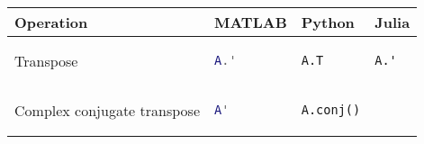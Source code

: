 \documentclass[10pt, landscape]{article}
\begin{document}
\begin{multicols}{2}
\begin{tabular}[]{@{}llll@{}}
\toprule
\begin{minipage}[b]{0.24\columnwidth}\raggedright\strut
Operation\strut
\end{minipage} & \begin{minipage}[b]{0.23\columnwidth}\raggedright\strut
MATLAB\strut
\end{minipage} & \begin{minipage}[b]{0.20\columnwidth}\raggedright\strut
Python\strut
\end{minipage} & \begin{minipage}[b]{0.20\columnwidth}\raggedright\strut
Julia\strut
\end{minipage}\tabularnewline
\midrule
\begin{minipage}[t]{0.24\columnwidth}\raggedright\strut
Transpose\strut
\end{minipage} & \begin{minipage}[t]{0.23\columnwidth}\raggedright\strut
\begin{lstlisting}[language=Matlab]
A.'
\end{lstlisting}
\strut
\end{minipage} & \begin{minipage}[t]{0.20\columnwidth}\raggedright\strut
\begin{lstlisting}[language=Python]
A.T
\end{lstlisting}
\strut
\end{minipage} & \begin{minipage}[t]{0.20\columnwidth}\raggedright\strut
\begin{lstlisting}
A.'
\end{lstlisting}
\strut
\end{minipage}\tabularnewline
\begin{minipage}[t]{0.24\columnwidth}\raggedright\strut
Complex conjugate transpose\strut
\end{minipage} & \begin{minipage}[t]{0.23\columnwidth}\raggedright\strut
\begin{lstlisting}[language=Matlab]
A'
\end{lstlisting}
\strut
\end{minipage} & \begin{minipage}[t]{0.20\columnwidth}\raggedright\strut
\begin{lstlisting}[language=Python]
A.conj()
\end{lstlisting}
\strut
\end{minipage} & \begin{minipage}[t]{0.20\columnwidth}\raggedright\strut

\end{minipage}
\end{tabular}
\end{multicols}
\end{document}
